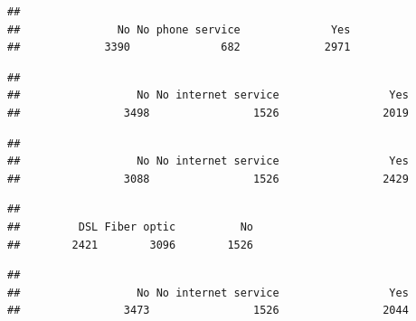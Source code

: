 \documentclass[
]{article}
\newenvironment{Shaded}{\begin{snugshade}}{\end{snugshade}}
\newcommand{\CommentTok}[1]{\textcolor[rgb]{0.56,0.35,0.01}{\textit{#1}}}
\newcommand{\FunctionTok}[1]{\textcolor[rgb]{0.13,0.29,0.53}{\textbf{#1}}}
\newcommand{\NormalTok}[1]{#1}
\newcommand{\SpecialCharTok}[1]{\textcolor[rgb]{0.81,0.36,0.00}{\textbf{#1}}}
\begin{document}
\begin{verbatim}
## 
##               No No phone service              Yes 
##             3390              682             2971
\end{verbatim}

\begin{Shaded}
\end{Shaded}

\begin{verbatim}
## 
##                  No No internet service                 Yes 
##                3498                1526                2019
\end{verbatim}

\begin{Shaded}
\end{Shaded}

\begin{verbatim}
## 
##                  No No internet service                 Yes 
##                3088                1526                2429
\end{verbatim}

\begin{Shaded}
\end{Shaded}

\begin{verbatim}
## 
##         DSL Fiber optic          No 
##        2421        3096        1526
\end{verbatim}

\begin{Shaded}
\end{Shaded}

\begin{verbatim}
## 
##                  No No internet service                 Yes 
##                3473                1526                2044
\end{verbatim}
\end{document}
